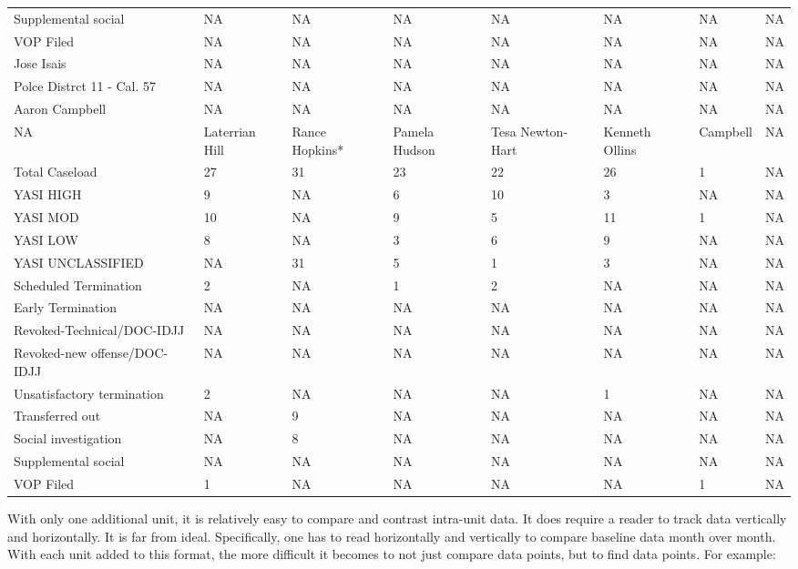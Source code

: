 \documentclass[12pt,]{article}
\begin{document}
\begin{table}[!h]
{\begin{tabular}[t]{llllllll}
Supplemental social & NA & NA & NA & NA & NA & NA & NA\\
VOP Filed & NA & NA & NA & NA & NA & NA & NA\\
Jose Isais & NA & NA & NA & NA & NA & NA & NA\\
Polce Distrct 11 - Cal. 57 & NA & NA & NA & NA & NA & NA & NA\\
\addlinespace
Aaron Campbell & NA & NA & NA & NA & NA & NA & NA\\
NA & Laterrian Hill & Rance Hopkins* & Pamela Hudson & Tesa Newton-Hart & Kenneth Ollins & Campbell & NA\\
Total Caseload & 27 & 31 & 23 & 22 & 26 & 1 & NA\\
YASI HIGH & 9 & NA & 6 & 10 & 3 & NA & NA\\
YASI MOD & 10 & NA & 9 & 5 & 11 & 1 & NA\\
\addlinespace
YASI LOW & 8 & NA & 3 & 6 & 9 & NA & NA\\
YASI UNCLASSIFIED & NA & 31 & 5 & 1 & 3 & NA & NA\\
Scheduled Termination & 2 & NA & 1 & 2 & NA & NA & NA\\
Early Termination & NA & NA & NA & NA & NA & NA & NA\\
Revoked-Technical/DOC-IDJJ & NA & NA & NA & NA & NA & NA & NA\\
\addlinespace
Revoked-new offense/DOC-IDJJ & NA & NA & NA & NA & NA & NA & NA\\
Unsatisfactory termination & 2 & NA & NA & NA & 1 & NA & NA\\
Transferred out & NA & 9 & NA & NA & NA & NA & NA\\
Social investigation & NA & 8 & NA & NA & NA & NA & NA\\
Supplemental social & NA & NA & NA & NA & NA & NA & NA\\
VOP Filed & 1 & NA & NA & NA & NA & 1 & NA\\
\bottomrule
\end{tabular}}
\end{table}

\newpage

With only one additional unit, it is relatively easy to compare and
contrast intra-unit data. It does require a reader to track data
vertically and horizontally. It is far from ideal. Specifically, one has
to read horizontally and vertically to compare baseline data month over
month. With each unit added to this format, the more difficult it
becomes to not just compare data points, but to find data points. For
example:
\end{document}
